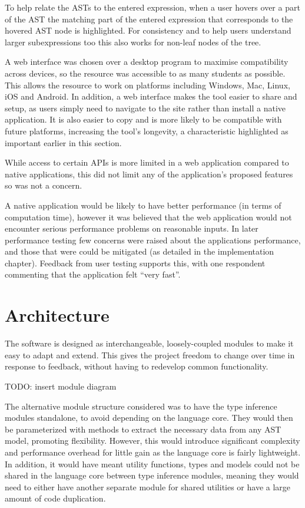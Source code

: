 \documentclass[a4paper,fleqn,oneside,12pt]{report}
\begin{document}
To help relate the ASTs to the entered expression, when a user hovers over a part of the AST the matching part of the entered expression that corresponds to the hovered AST node is highlighted. For consistency and to help users understand larger subexpressions too this also works for non-leaf nodes of the tree.

A web interface was chosen over a desktop program to maximise compatibility across devices, so the resource was accessible to as many students as possible. This allows the resource to work on platforms including Windows, Mac, Linux, iOS and Android. In addition, a web interface makes the tool easier to share and setup, as users simply need to navigate to the site rather than install a native application. It is also easier to copy and is more likely to be compatible with future platforms, increasing the tool's longevity, a characteristic highlighted as important earlier in this section.

While access to certain APIs is more limited in a web application compared to native applications, this did not limit any of the application's proposed features so was not a concern.

A native application would be likely to have better performance (in terms of computation time), however it was believed that the web application would not encounter serious performance problems on reasonable inputs. In later performance testing few concerns were raised about the applications performance, and those that were could be mitigated (as detailed in the implementation chapter). Feedback from user testing supports this, with one respondent commenting that the application felt ``very fast''.

\section{Architecture}\label{id:h.l33hnjbawceh}

The software is designed as interchangeable, loosely-coupled modules to make it easy to adapt and extend. This gives the project freedom to change over time in response to feedback, without having to redevelop common functionality.

TODO: insert module diagram

The alternative module structure considered was to have the type inference modules standalone, to avoid depending on the language core. They would then be parameterized with methods to extract the necessary data from any AST model, promoting flexibility. However, this would introduce significant complexity and performance overhead for little gain as the language core is fairly lightweight. In addition, it would have meant utility functions, types and models could not be shared in the language core between type inference modules, meaning they would need to either have another separate module for shared utilities or have a large amount of code duplication.
\end{document}
